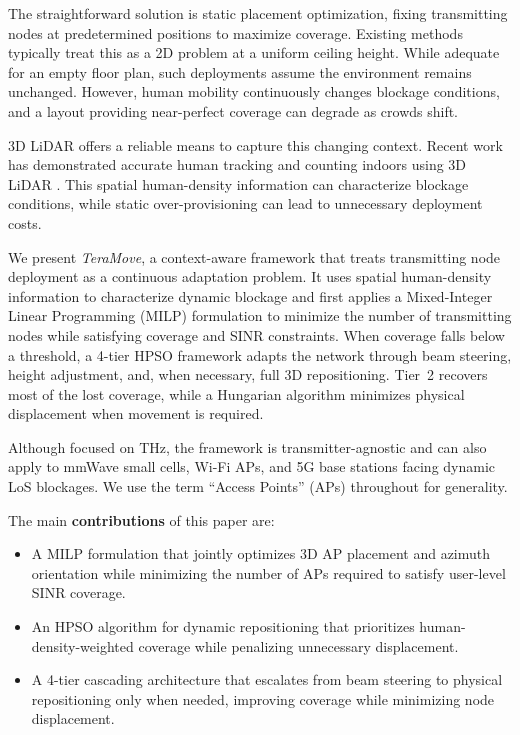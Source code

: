 \documentclass[conference]{IEEEtran}
\begin{document}
	The straightforward solution is static placement optimization, fixing transmitting nodes at predetermined positions to maximize coverage. Existing methods typically treat this as a 2D problem at a uniform ceiling height. While adequate for an empty floor plan, such deployments assume the environment remains unchanged. However, human mobility continuously changes blockage conditions, and a layout providing near-perfect coverage can degrade as crowds shift.
	
	3D LiDAR offers a reliable means to capture this changing context. Recent work has demonstrated accurate human tracking and counting indoors using 3D LiDAR \cite{b27,b29}. This spatial human-density information can characterize blockage conditions, while static over-provisioning can lead to unnecessary deployment costs.
	
	We present \textit{TeraMove}, a context-aware framework that treats transmitting node deployment as a continuous adaptation problem. It uses spatial human-density information to characterize dynamic blockage and first applies a Mixed-Integer Linear Programming (MILP) formulation to minimize the number of transmitting nodes while satisfying coverage and SINR constraints. When coverage falls below a threshold, a 4-tier HPSO framework adapts the network through beam steering, height adjustment, and, when necessary, full 3D repositioning. Tier~2 recovers most of the lost coverage, while a Hungarian algorithm minimizes physical displacement when movement is required.
	
	Although focused on THz, the framework is transmitter-agnostic and can also apply to mmWave small cells, Wi-Fi APs, and 5G base stations facing dynamic LoS blockages. We use the term ``Access Points'' (APs) throughout for generality.
	
	
	The main \textbf{contributions} of this paper are:
	\begin{itemize}
		\item A MILP formulation that jointly optimizes 3D AP placement and azimuth orientation while minimizing the number of APs required to satisfy user-level SINR coverage.
		
		\item An HPSO algorithm for dynamic repositioning that prioritizes human-density-weighted coverage while penalizing unnecessary displacement.
		
		\item A 4-tier cascading architecture that escalates from beam steering to physical repositioning only when needed, improving coverage while minimizing node displacement.
	\end{itemize}
	
\end{document}
